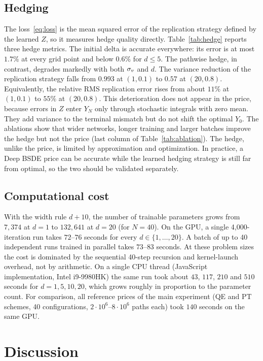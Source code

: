 
\subsection{Hedging}\label{sec:hedging}
The loss~\eqref{eq:loss} is the mean squared error of the replication strategy defined by the learned $Z$, so it measures hedge quality directly. Table~\ref{tab:hedge} reports three hedge metrics. The initial delta is accurate everywhere: its error is at most $1.7\%$ at every grid point and below $0.6\%$ for $d\le5$. The pathwise hedge, in contrast, degrades markedly with both $\sigma_v$ and $d$. The variance reduction of the replication strategy falls from $0.993$ at $(1,0.1)$ to $0.57$ at $(20,0.8)$. Equivalently, the relative RMS replication error rises from about $11\%$ at $(1,0.1)$ to $55\%$ at $(20,0.8)$. This deterioration does not appear in the price, because errors in $Z$ enter $Y_N$ only through stochastic integrals with zero mean. They add variance to the terminal mismatch but do not shift the optimal $Y_0$. The ablations show that wider networks, longer training and larger batches improve the hedge but not the price (last column of Table~\ref{tab:ablation}). The hedge, unlike the price, is limited by approximation and optimization. In practice, a Deep BSDE price can be accurate while the learned hedging strategy is still far from optimal, so the two should be validated separately.

\subsection{Computational cost}\label{sec:cost}
With the width rule $d+10$, the number of trainable parameters grows from $7{,}374$ at $d=1$ to $132{,}641$ at $d=20$ (for $N=40$). On the GPU, a single 4{,}000-iteration run takes $72$--$76$ seconds for every $d\in\{1,\dots,20\}$. A batch of up to 40 independent runs trained in parallel takes $73$--$83$ seconds. At these problem sizes the cost is dominated by the sequential 40-step recursion and kernel-launch overhead, not by arithmetic. On a single CPU thread (JavaScript implementation, Intel i9-9980HK) the same run took about $43$, $117$, $210$ and $510$ seconds for $d=1,5,10,20$, which grows roughly in proportion to the parameter count. For comparison, all reference prices of the main experiment (QE and PT schemes, 40 configurations, $2\cdot10^6$--$8\cdot10^6$ paths each) took $140$ seconds on the same GPU.


\section{Discussion}\label{sec:discussion}


